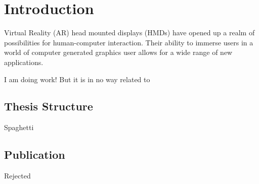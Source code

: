 \chapter{Introduction}

Virtual Reality (AR) head mounted displays (HMDs) have opened up a realm of possibilities for human-computer interaction. Their ability to immerse users in a world of computer generated graphics user allows for a wide range of new applications.

I am doing work! But it is in no way related to \cite{Rogers}

\section{Thesis Structure}

Spaghetti 

\section{Publication}

Rejected